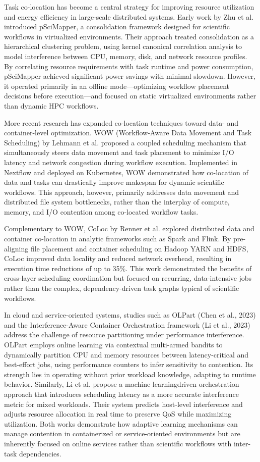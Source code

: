 Task co-location has become a central strategy for improving resource utilization and energy efficiency in large-scale distributed systems. Early work by Zhu et al. introduced pSciMapper, a consolidation framework designed for scientific workflows in virtualized environments. Their approach treated consolidation as a hierarchical clustering problem, using kernel canonical correlation analysis to model interference between CPU, memory, disk, and network resource profiles. By correlating resource requirements with task runtime and power consumption, pSciMapper achieved significant power savings with minimal slowdown. However, it operated primarily in an offline mode—optimizing workflow placement decisions before execution—and focused on static virtualized environments rather than dynamic HPC workflows.

More recent research has expanded co-location techniques toward data- and container-level optimization. WOW (Workflow-Aware Data Movement and Task Scheduling) by Lehmann et al. proposed a coupled scheduling mechanism that simultaneously steers data movement and task placement to minimize I/O latency and network congestion during workflow execution. Implemented in Nextflow and deployed on Kubernetes, WOW demonstrated how co-location of data and tasks can drastically improve makespan for dynamic scientific workflows. This approach, however, primarily addresses data movement and distributed file system bottlenecks, rather than the interplay of compute, memory, and I/O contention among co-located workflow tasks.

Complementary to WOW, CoLoc by Renner et al. explored distributed data and container co-location in analytic frameworks such as Spark and Flink. By pre-aligning file placement and container scheduling on Hadoop YARN and HDFS, CoLoc improved data locality and reduced network overhead, resulting in execution time reductions of up to 35\%. This work demonstrated the benefits of cross-layer scheduling coordination but focused on recurring, data-intensive jobs rather than the complex, dependency-driven task graphs typical of scientific workflows.

In cloud and service-oriented systems, studies such as OLPart (Chen et al., 2023) and the Interference-Aware Container Orchestration framework (Li et al., 2023) address the challenge of resource partitioning under performance interference. OLPart employs online learning via contextual multi-armed bandits to dynamically partition CPU and memory resources between latency-critical and best-effort jobs, using performance counters to infer sensitivity to contention. Its strength lies in operating without prior workload knowledge, adapting to runtime behavior. Similarly, Li et al. propose a machine learningdriven orchestration approach that introduces scheduling latency as a more accurate interference metric for mixed workloads. Their system predicts host-level interference and adjusts resource allocation in real time to preserve QoS while maximizing utilization. Both works demonstrate how adaptive learning mechanisms can manage contention in containerized or service-oriented environments but are inherently focused on online services rather than scientific workflows with inter-task dependencies.


